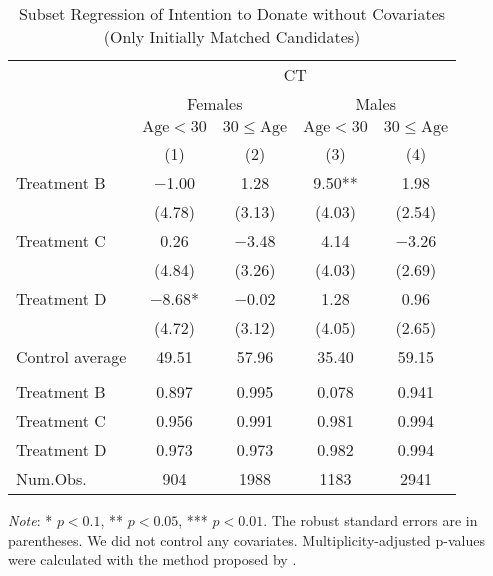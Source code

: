 \documentclass[12pt, a4paper]{article}
\begin{document}
\begin{table}[H]

\caption{\label{tab:lm-positive-subset1-init}Subset Regression of Intention to Donate without Covariates (Only Initially Matched Candidates)}
\centering
\fontsize{8}{10}\selectfont
\begin{threeparttable}
\begin{tabular}[t]{lcccc}
\toprule
\multicolumn{1}{c}{ } & \multicolumn{4}{c}{CT} \\
\cmidrule(l{3pt}r{3pt}){2-5}
\multicolumn{1}{c}{ } & \multicolumn{2}{c}{Females} & \multicolumn{2}{c}{Males} \\
\cmidrule(l{3pt}r{3pt}){2-3} \cmidrule(l{3pt}r{3pt}){4-5}
\multicolumn{1}{c}{ } & \multicolumn{1}{c}{$\text{Age} < 30$} & \multicolumn{1}{c}{$30 \le \text{Age}$} & \multicolumn{1}{c}{$\text{Age} < 30$} & \multicolumn{1}{c}{$30 \le \text{Age}$} \\
\cmidrule(l{3pt}r{3pt}){2-2} \cmidrule(l{3pt}r{3pt}){3-3} \cmidrule(l{3pt}r{3pt}){4-4} \cmidrule(l{3pt}r{3pt}){5-5}
  & (1) & (2) & (3) & (4)\\
\midrule
Treatment B & \num{-1.00} & \num{1.28} & \num{9.50}** & \num{1.98}\\
 & (\num{4.78}) & (\num{3.13}) & (\num{4.03}) & (\num{2.54})\\
Treatment C & \num{0.26} & \num{-3.48} & \num{4.14} & \num{-3.26}\\
 & (\num{4.84}) & (\num{3.26}) & (\num{4.03}) & (\num{2.69})\\
Treatment D & \num{-8.68}* & \num{-0.02} & \num{1.28} & \num{0.96}\\
 & (\num{4.72}) & (\num{3.12}) & (\num{4.05}) & (\num{2.65})\\
\midrule
Control average & 49.51 & 57.96 & 35.40 & 59.15\\
\addlinespace[0.3em]
\multicolumn{5}{l}{\textit{Multiplicity-adjusted p-values}}\\
\hspace{1em}Treatment B & 0.897 & 0.995 & 0.078 & 0.941\\
\hspace{1em}Treatment C & 0.956 & 0.991 & 0.981 & 0.994\\
\hspace{1em}Treatment D & 0.973 & 0.973 & 0.982 & 0.994\\
Num.Obs. & \num{904} & \num{1988} & \num{1183} & \num{2941}\\
\bottomrule
\end{tabular}
\begin{tablenotes}
\item \emph{Note}: * $p < 0.1$, ** $p < 0.05$, *** $p < 0.01$. The robust standard errors are in parentheses. We did not control any covariates. Multiplicity-adjusted p-values were calculated with the method proposed by \cite{List2019}.
\end{tablenotes}
\end{threeparttable}
\end{table}
\end{document}
